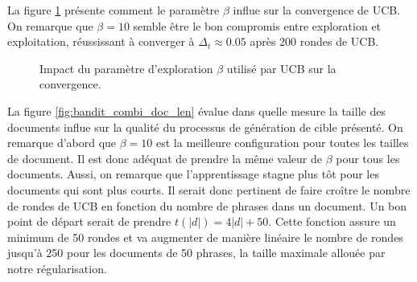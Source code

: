 La figure \ref{fig:bandit_combi_alpha} présente comment le paramètre $\beta$ influe sur la
convergence de UCB.
On remarque que $\beta=10$ semble être le bon compromis entre exploration et exploitation,
réussissant à converger à $\Delta_t \approx 0.05$ après 200 rondes de UCB.

\begin{figure}[h!]
    \begin{center}
    \end{center}
    \caption{Impact du paramètre d'exploration $\beta$ utilisé par UCB sur la convergence.}
    \label{fig:bandit_combi_alpha}
\end{figure}

La figure \ref{fig:bandit_combi_doc_len} évalue dans quelle mesure la taille des documents
influe sur la qualité du processus de génération de cible présenté.
On remarque d'abord que $\beta=10$ est la meilleure configuration pour toutes les tailles
de document.
Il est donc adéquat de prendre la même valeur de $\beta$ pour tous les documents.
Aussi, on remarque que l'apprentissage stagne plus tôt pour les documents qui sont
plus courts.
Il serait donc pertinent de faire croître le nombre de rondes de UCB en fonction du nombre de
phrases dans un document.
Un bon point de départ serait de prendre $t(|d|) = 4 |d| + 50$.
Cette fonction assure un minimum de 50 rondes et va augmenter de manière linéaire
le nombre de rondes jusqu'à 250 pour les documents de 50 phrases, la taille maximale
allouée par notre régularisation.

